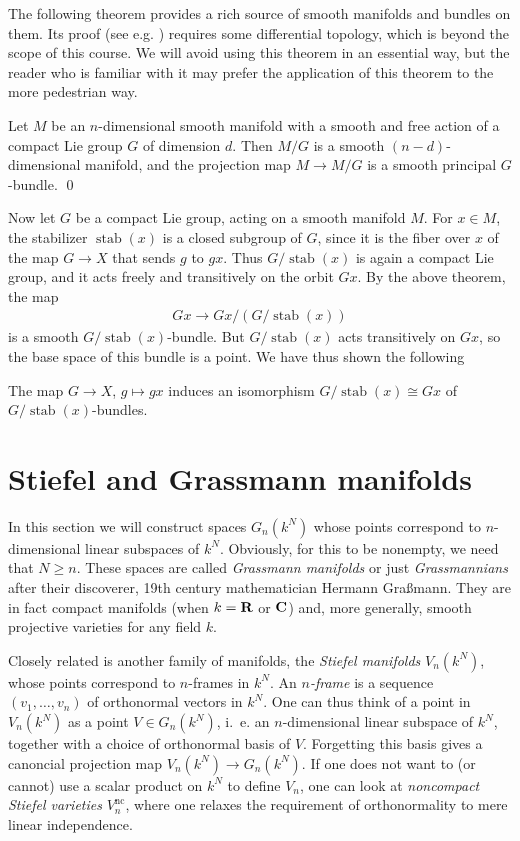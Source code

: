 \documentclass[a4paper,openany]{scrbook}
\DeclareMathOperator{\stab}{stab}
\begin{document}
The following theorem provides a rich source of smooth manifolds and bundles on them. Its proof (see e.g. \cite[Chapter 7]{lee:smooth-manifolds}) requires some differential topology, which is beyond the scope of this course. We will avoid using this theorem in an essential way, but the reader who is familiar with it may prefer the application of this theorem to the more pedestrian way.

\begin{thm} \label{thm:freeLiegroupaction}
Let $M$ be an $n$-dimensional smooth manifold with a smooth and free action of a compact Lie group $G$ of dimension $d$. Then $M/G$ is a smooth $(n-d)$-dimensional manifold, and the projection map $M \to M/G$ is a smooth principal $G$-bundle. \qed
\end{thm}

Now let $G$ be a compact Lie group, acting on a smooth manifold $M$. For $x \in M$, the stabilizer $\stab(x)$ is a closed subgroup of $G$, since it is the fiber over $x$ of the map $G \to X$ that sends $g$ to $gx$. Thus $G/ \stab(x)$ is again a compact Lie group, and it acts freely and transitively on the orbit $Gx$. By the above theorem, the map
\begin{align*}
Gx \to Gx / (G/\stab(x))
\end{align*}
is a smooth $G/\stab(x)$-bundle. But $G/\stab(x)$ acts transitively on $Gx$, so the base space of this bundle is a point. We have thus shown the following
\begin{corollary}
	The map $G \to X$, $g \mapsto gx$ induces an isomorphism $G/\stab(x) \cong Gx$ of $G/\stab(x)$-bundles.
\end{corollary}	


\section{Stiefel and Grassmann manifolds}\label{sec:stiefelgrassmann}

In this section we will construct spaces $G_n(k^N)$ whose points correspond to $n$-dimensional linear subspaces of $k^N$. Obviously, for this to be nonempty, we need that $N \geq n$. These spaces are called \emph{Grassmann manifolds} or just \emph{Grassmannians} after their discoverer, 19th century mathematician Hermann Graßmann. They are in fact compact manifolds (when $k=\mathbf R$ or $\mathbf C$) and, more generally, smooth projective varieties for any field $k$.

Closely related is another family of manifolds, the \emph{Stiefel manifolds} $V_n(k^N)$, whose points correspond to $n$-frames in $k^N$. An \emph{$n$-frame} is a sequence $(v_1,\dots,v_n)$ of orthonormal vectors in $k^N$. One can thus think of a point in $V_n(k^N)$ as a point $V \in G_n(k^N)$, i.~e. an $n$-dimensional linear subspace of $k^N$, together with a choice of orthonormal basis of $V$. Forgetting this basis gives a canoncial projection map $V_n(k^N) \to G_n(k^N)$. If one does not want to (or cannot) use a scalar product on $k^N$ to define $V_n$, one can look at \emph{noncompact Stiefel varieties} $V_n^{\operatorname{nc}}$, where one relaxes the requirement of orthonormality to mere linear independence.
\end{document}

